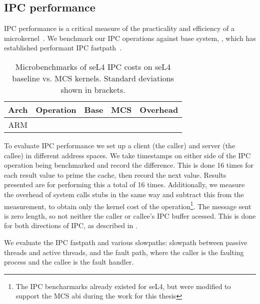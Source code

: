 
\subsection{IPC performance}

\Gls{IPC} performance is a critical measure of the practicality and efficiency of a
microkernel~\citep{Liedtke_95}. We benchmark our \gls{IPC} operations against base system, \selfour,
which has established performant \gls{IPC} fastpath~\citep{Elphinstone_Heiser_13}. 

\begin{table}[ht]\centering
\begin{tabular}{|c|l| r@{~}l | r@{~}l |r@{~}r|}\hline
\textbf{Arch}           & \multicolumn{1}{c|}{\textbf{Operation}}
                                & \multicolumn{2}{c|}{\textbf{Base}}
                                & \multicolumn{2}{c|}{\textbf{MCS}}
                                & \multicolumn{2}{c|}{\textbf{Overhead}} \\ \hline
\multirow{7}{*}{ARM}

\hline
\multirow{7}{*}{x64}

\hline
\end{tabular}
\caption{Microbenchmarks of seL4 IPC costs on seL4 baseline vs. MCS kernels. Standard deviations
shown in brackets.}
\label{t:micro}
\end{table}

To evaluate IPC performance we set up a client (the caller) and server (the callee) in different
address spaces. We take
timestamps on either side of the IPC operation being benchmarked and record the difference. This is
done 16 times for each result value to prime the cache, then record the next value. Results
presented are for performing this a total of 16 times. Additionally, we measure the overhead of
system calls stubs in the same way and subtract this from the measurement, to obtain only the kernel
cost of the operation\footnote{The IPC bencharmarks already existed for seL4, but were modified to
support the \gls{MCS} abi during the work for this thesis}. The message sent is zero length, so not
neither the caller or callee's \gls{IPC} buffer acessed.
This is done for both directions of IPC, as described in . 

We evaluate the \gls{IPC} fastpath and various slowpaths: slowpath between passive threads and
active threads, and the fault path, where the caller is the faulting process and the callee is the
fault handler.

